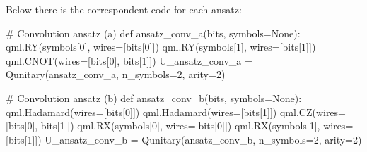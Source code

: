 \documentclass[
  13pt,
  a4paper,
  DIV=11,
  numbers=noendperiod,
  oneside]{scrreprt}
\newenvironment{Shaded}{\begin{snugshade}}{\end{snugshade}}
\newcommand{\CommentTok}[1]{\textcolor[rgb]{0.37,0.37,0.37}{#1}}
\newcommand{\DecValTok}[1]{\textcolor[rgb]{0.68,0.00,0.00}{#1}}
\newcommand{\KeywordTok}[1]{\textcolor[rgb]{0.00,0.23,0.31}{#1}}
\newcommand{\NormalTok}[1]{\textcolor[rgb]{0.00,0.23,0.31}{#1}}
\newcommand{\OperatorTok}[1]{\textcolor[rgb]{0.37,0.37,0.37}{#1}}
\newcommand{\VariableTok}[1]{\textcolor[rgb]{0.07,0.07,0.07}{#1}}
\begin{document}
Below there is the correspondent code for each ansatz:

\begin{Shaded}
\begin{Highlighting}[]
\CommentTok{\# Convolution ansatz (a) }
\KeywordTok{def}\NormalTok{ ansatz\_conv\_a(bits, symbols}\OperatorTok{=}\VariableTok{None}\NormalTok{):}
\NormalTok{  qml.RY(symbols[}\DecValTok{0}\NormalTok{], wires}\OperatorTok{=}\NormalTok{[bits[}\DecValTok{0}\NormalTok{]])}
\NormalTok{  qml.RY(symbols[}\DecValTok{1}\NormalTok{], wires}\OperatorTok{=}\NormalTok{[bits[}\DecValTok{1}\NormalTok{]])}
\NormalTok{  qml.CNOT(wires}\OperatorTok{=}\NormalTok{[bits[}\DecValTok{0}\NormalTok{], bits[}\DecValTok{1}\NormalTok{]])}
\NormalTok{U\_ansatz\_conv\_a }\OperatorTok{=}\NormalTok{ Qunitary(ansatz\_conv\_a, n\_symbols}\OperatorTok{=}\DecValTok{2}\NormalTok{, arity}\OperatorTok{=}\DecValTok{2}\NormalTok{)}

\CommentTok{\# Convolution ansatz (b) }
\KeywordTok{def}\NormalTok{ ansatz\_conv\_b(bits, symbols}\OperatorTok{=}\VariableTok{None}\NormalTok{):}
\NormalTok{  qml.Hadamard(wires}\OperatorTok{=}\NormalTok{[bits[}\DecValTok{0}\NormalTok{]])}
\NormalTok{  qml.Hadamard(wires}\OperatorTok{=}\NormalTok{[bits[}\DecValTok{1}\NormalTok{]])}
\NormalTok{  qml.CZ(wires}\OperatorTok{=}\NormalTok{[bits[}\DecValTok{0}\NormalTok{], bits[}\DecValTok{1}\NormalTok{]])}
\NormalTok{  qml.RX(symbols[}\DecValTok{0}\NormalTok{], wires}\OperatorTok{=}\NormalTok{[bits[}\DecValTok{0}\NormalTok{]])}
\NormalTok{  qml.RX(symbols[}\DecValTok{1}\NormalTok{], wires}\OperatorTok{=}\NormalTok{[bits[}\DecValTok{1}\NormalTok{]])}
\NormalTok{U\_ansatz\_conv\_b }\OperatorTok{=}\NormalTok{ Qunitary(ansatz\_conv\_b, n\_symbols}\OperatorTok{=}\DecValTok{2}\NormalTok{, arity}\OperatorTok{=}\DecValTok{2}\NormalTok{)}


\end{Highlighting}
\end{Shaded}
\end{document}
